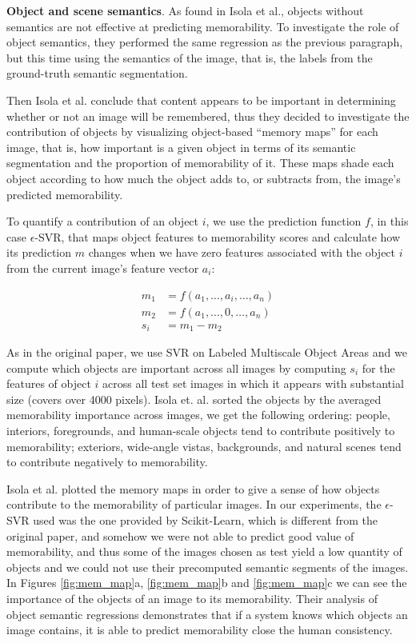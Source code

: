 \documentclass[10pt,twocolumn,letterpaper]{article}
\begin{document}
\textbf{Object and scene semantics}. As found in Isola et al., objects without semantics are not effective at predicting memorability. To investigate the role of object semantics, they performed the same regression as the previous paragraph, but this time using the semantics of the image, that is, the labels from the ground-truth semantic segmentation.

Then Isola et al. conclude that content appears to be important in determining whether or not an image will be remembered, thus they decided to investigate the contribution of objects by visualizing object-based ``memory maps'' for each image, that is, how important is a given object in terms of its semantic segmentation and the proportion of memorability of it. These maps shade each object according to how much the object adds to, or subtracts from, the image's predicted memorability.

To quantify a contribution of an object $i$, we use the prediction function $f$, in this case $\epsilon$-SVR, that maps object features to memorability scores and calculate how its prediction $m$ changes when we have zero features associated with the object $i$ from the current image's feature vector $a_i$:

\begin{ceqn}
\begin{align*}
    m_1 &= f(a_1, \dots, a_i, \dots, a_n)\\
    m_2 &= f(a_1, \dots, 0, \dots, a_n)\\
    s_i &= m_1 - m_2
\end{align*}
\end{ceqn}

As in the original paper, we use SVR on Labeled Multiscale Object Areas and we compute which objects are important across all images by computing $s_i$ for the features of object $i$ across all test set images in which it appears with substantial size (covers over 4000 pixels). Isola et. al. sorted the objects by the averaged memorability importance across images, we get the following ordering: people, interiors, foregrounds, and human-scale objects tend to contribute positively to memorability; exteriors, wide-angle vistas, backgrounds, and natural scenes tend to contribute negatively to memorability.

Isola et al. plotted the memory maps in order to give a sense of how objects contribute to the memorability of particular images. In our experiments, the $\epsilon$-SVR used was the one provided by Scikit-Learn, which is different from the original paper, and somehow we were not able to predict good value of memorability, and thus some of the images chosen as test yield a low quantity of objects and we could not use their precomputed semantic segments of the images. In Figures \ref{fig:mem_map}a, \ref{fig:mem_map}b and \ref{fig:mem_map}c we can see the importance of the objects of an image to its memorability. Their analysis of object semantic regressions demonstrates that if a system knows which objects an image contains, it is able to predict memorability close the human consistency.
\end{document}

